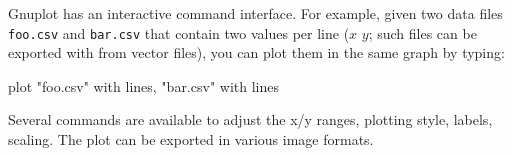 Gnuplot has an interactive command interface. For example, given two
data files \texttt{foo.csv} and \texttt{bar.csv} that contain
two values per line ($x$ $y$; such files can be exported with
 from vector files), you can plot them in the same
graph by typing:

\begin{commandline}
plot "foo.csv" with lines, "bar.csv" with lines
\end{commandline}

Several commands are available to adjust the x/y ranges, plotting style, labels,
scaling. The plot can be exported in various image formats.



